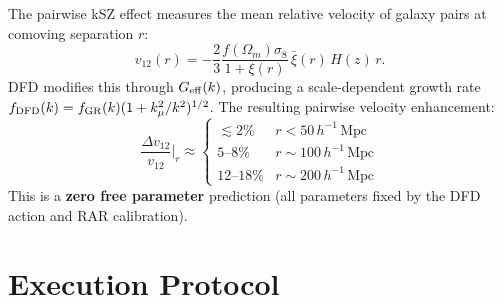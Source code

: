 \documentclass[11pt]{article}
\newcommand{\Geff}{G_{\rm eff}}
\begin{document}
The pairwise kSZ effect measures the mean relative velocity of galaxy
pairs at comoving separation $r$:
\begin{equation}
v_{12}(r) = -\frac{2}{3}\frac{f(\Omega_m)\sigma_8}{1 + \xi(r)}\,
\bar{\xi}(r)\,H(z)\,r.
\end{equation}
DFD modifies this through $\Geff(k)$, producing a scale-dependent
growth rate $f_{\rm DFD}(k) = f_{\rm GR}(k)(1 + k_\mu^2/k^2)^{1/2}$.
The resulting pairwise velocity enhancement:
\begin{equation}
\frac{\Delta v_{12}}{v_{12}}\bigg|_{r} \approx
\begin{cases}
\lesssim 2\% & r < 50\,h^{-1}\,\text{Mpc} \\
5\text{--}8\% & r \sim 100\,h^{-1}\,\text{Mpc} \\
12\text{--}18\% & r \sim 200\,h^{-1}\,\text{Mpc}
\end{cases}
\end{equation}
This is a \textbf{zero free parameter} prediction (all parameters fixed
by the DFD action and RAR calibration).

\section{Execution Protocol}
\end{document}
